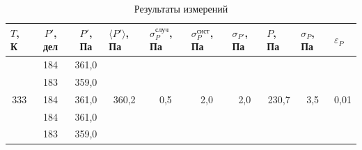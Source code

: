 \documentclass[a4paper,12pt]{article}
\begin{document}
\begin{table}[H]
\begin{tabular}{|c|c|c|c|c|c|c|c|c|c|}
\hline
\multicolumn{1}{|l|}{$ T $, К} & $ P' $, дел & $ P' $, Па & \multicolumn{1}{l|}{$ \langle P' \rangle $, Па} & \multicolumn{1}{l|}{$\sigma_P^{случ}$, Па} & \multicolumn{1}{l|}{$\sigma_P^{сист}$, Па} & \multicolumn{1}{l|}{$ \sigma_{P'} $, Па} & \multicolumn{1}{l|}{$ P $, Па} & \multicolumn{1}{l|}{$ \sigma_P $, Па} & \multicolumn{1}{l|}{$\varepsilon_P$} \\ \hline
\multirow{5}{*}{333}           & 184         & 361,0      & \multirow{5}{*}{360,2}                          & \multirow{5}{*}{0,5}                       & \multirow{5}{*}{2,0}                       & \multirow{5}{*}{2,0}                     & \multirow{5}{*}{230,7}         & \multirow{5}{*}{3,5}                  & \multirow{5}{*}{0,01}                \\ \cline{2-3}
                               & 183         & 359,0      &                                                 &                                            &                                            &                                          &                                &                                       &                                      \\ \cline{2-3}
                               & 184         & 361,0      &                                                 &                                            &                                            &                                          &                                &                                       &                                      \\ \cline{2-3}
                               & 184         & 361,0      &                                                 &                                            &                                            &                                          &                                &                                       &                                      \\ \cline{2-3}
                               & 183         & 359,0      &                                                 &                                            &                                            &                                          &                                &                                       &                                      \\ \hline
\end{tabular}
\caption{Результаты измерений}
\end{table}
\end{document}
